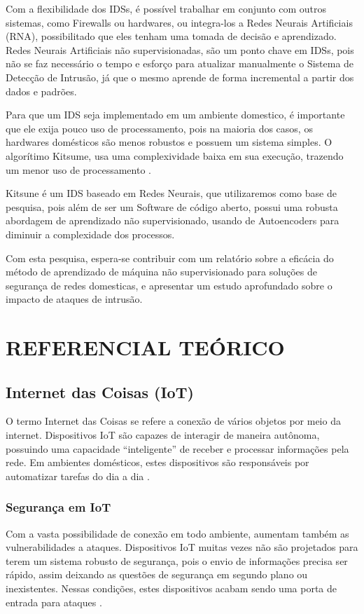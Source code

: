 Com a flexibilidade dos IDSs, é possível trabalhar em conjunto com outros sistemas, como Firewalls ou hardwares, ou integra-los a Redes Neurais Artificiais (RNA), possibilitado que eles tenham uma tomada de decisão e aprendizado.
Redes Neurais Artificiais não supervisionadas, são um ponto chave em IDSs, pois não se faz necessário o tempo e esforço para atualizar manualmente o Sistema de Detecção de Intrusão, já que o mesmo aprende de forma incremental a partir dos dados e padrões. 

Para que um IDS seja implementado em um ambiente domestico, é importante que ele exija pouco uso de processamento, pois na maioria dos casos, os hardwares domésticos são menos robustos e possuem um sistema simples. O algorítimo Kitsume, usa uma complexividade baixa em sua execução, trazendo um menor uso de processamento \cite{kitsune}.

Kitsune é um IDS baseado em Redes Neurais, que utilizaremos como base de pesquisa, pois além de ser um Software de código aberto, possui uma robusta abordagem de aprendizado não supervisionado, usando de Autoencoders para diminuir a complexidade dos processos.

Com esta pesquisa, espera-se contribuir com um relatório sobre a eficácia do método de aprendizado de máquina não supervisionado para soluções de segurança de redes domesticas, e apresentar um estudo aprofundado sobre o impacto de ataques de intrusão.

\chapter{REFERENCIAL TEÓRICO}
\section{Internet das Coisas (IoT)}
O termo Internet das Coisas se refere a conexão de vários objetos por meio da internet. Dispositivos IoT são capazes de interagir de maneira autônoma, possuindo uma capacidade “inteligente” de receber e processar informações pela rede. Em ambientes domésticos, estes dispositivos são responsáveis por automatizar tarefas do dia a dia \cite{gokhale2018introduction}.
 
\subsection{Segurança em IoT}
Com a vasta possibilidade de conexão em todo ambiente, aumentam também as vulnerabilidades a ataques. Dispositivos IoT muitas vezes não são projetados para terem um sistema robusto de segurança, pois o envio de informações precisa ser rápido, assim deixando as questões de segurança em segundo plano ou inexistentes. Nessas condições, estes dispositivos acabam sendo uma porta de entrada para ataques \cite{Anthi}. 

